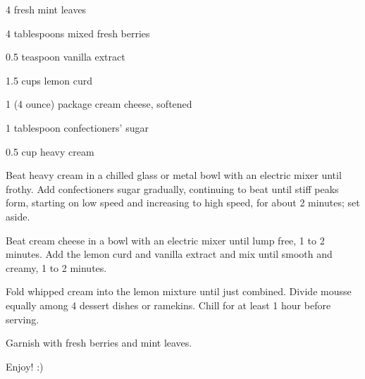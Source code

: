 \documentclass{RecipePage}
\begin{document}
\begin{multicols}{2}
\begin{ingredients}
\item{4 fresh mint leaves}
\item{4 tablespoons mixed fresh berries}
\item{0.5 teaspoon vanilla extract}
\item{1.5 cups lemon curd}
\item{1 (4 ounce) package cream cheese, softened}
\item{1 tablespoon confectioners' sugar}
\item{0.5 cup heavy cream}
\end{ingredients}
\columnbreak
\hspace*{-2cm}
\begin{instructions}
\item Beat heavy cream in a chilled glass or metal bowl with an electric mixer until frothy. Add confectioners sugar gradually, continuing to beat until stiff peaks form, starting on low speed and increasing to high speed, for about 2 minutes; set aside.
\item Beat cream cheese in a bowl with an electric mixer until lump free, 1 to 2 minutes. Add the lemon curd and vanilla extract and mix until smooth and creamy, 1 to 2 minutes.
\item Fold whipped cream into the lemon mixture until just combined. Divide mousse equally among 4 dessert dishes or ramekins. Chill for at least 1 hour before serving.
\item Garnish with fresh berries and mint leaves.
\end{instructions}
\end{multicols}
\begin{tips}
\item Enjoy! :)
\end{tips}
\end{document}
